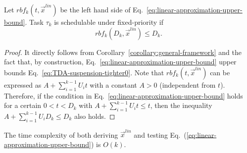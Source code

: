 \begin{theorem}
\label{theorem:linear-time-test}
Let $rbf_k(t, \vec{x}^{\mathit{lin}})$ be the left hand side of Eq.~\eqref{eq:linear-approximation-upper-bound}. Task $\tau_k$ is schedulable
  under fixed-priority if
  \begin{equation}
    \label{eq:linear-time-test}
    rbf_k(D_k, \vec{x}^{\mathit{lin}}) \leq D_k.
  \end{equation}
\end{theorem}
\begin{proof}
  It directly follows from Corollary~\ref{corollary:general-framework}
  and the fact that, by construction,
  Eq.~\eqref{eq:linear-approximation-upper-bound} upper bounds
  Eq.~\eqref{eq:TDA-suspension-tighter0}. Note that $rbf_k(t,
  \vec{x}^{\mathit{lin}})$ can be expressed as $A+\sum_{i=1}^{k-1} U_i
  t$ with a constant $A > 0$ (independent from $t$). Therefore, if the
  condition in Eq.~\eqref{eq:linear-approximation-upper-bound} holds
  for a certain $0 < t < D_k$ with $A+\sum_{i=1}^{k-1} U_i t \leq t$, then
  the inequality $A+\sum_{i=1}^{k-1} U_i D_k \leq D_k$ also holds.
\end{proof}

\begin{Property}
The time complexity of both deriving $\vec{x}^{\mathit{lin}}$ and testing Eq.~(\ref{eq:linear-approximation-upper-bound}) is $O(k)$.
\end{Property}


  




